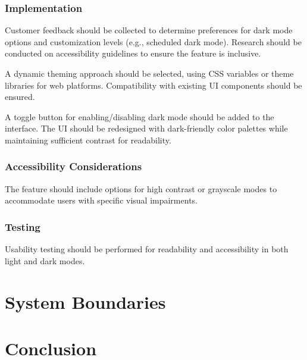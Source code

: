 \documentclass[a4paper,journal]{IEEEtran}
\begin{document}
\subsubsection{Implementation}
Customer feedback should be collected to determine preferences for dark mode
options and customization levels (e.g., scheduled dark mode).
Research should be conducted on accessibility guidelines to ensure the feature
is inclusive.

A dynamic theming approach should be selected, using CSS variables or theme
libraries for web platforms.
Compatibility with existing UI components should be ensured.

A toggle button for enabling/disabling dark mode should be added to the
interface.
The UI should be redesigned with dark-friendly color palettes while maintaining
sufficient contrast for readability.

\subsubsection{Accessibility Considerations}
The feature should include options for high contrast or grayscale modes to
accommodate users with specific visual impairments.

\subsubsection{Testing}
Usability testing should be performed for readability and accessibility in both
light and dark modes.

\section{System Boundaries}

\section{Conclusion}

\end{document}
